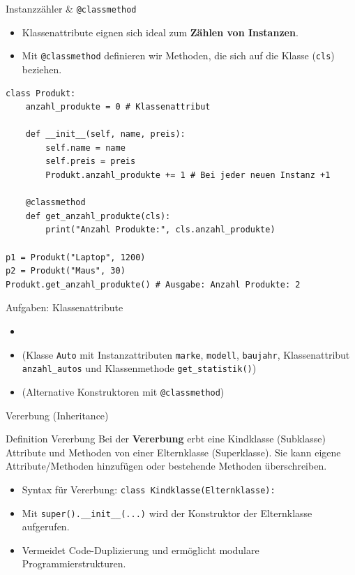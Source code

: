 \begin{frame}[fragile]{Instanzzähler \& \lstinline|@classmethod|}
	\begin{itemize}
		\item Klassenattribute eignen sich ideal zum \textbf{Zählen von Instanzen}.
		\item Mit \lstinline|@classmethod| definieren wir Methoden, die sich auf die Klasse (\lstinline|cls|) beziehen.
	\end{itemize}
	\begin{lstlisting}[basicstyle=\ttfamily\scriptsize]
class Produkt:
    anzahl_produkte = 0 # Klassenattribut

    def __init__(self, name, preis):
        self.name = name
        self.preis = preis
        Produkt.anzahl_produkte += 1 # Bei jeder neuen Instanz +1

    @classmethod
    def get_anzahl_produkte(cls):
        print("Anzahl Produkte:", cls.anzahl_produkte)

p1 = Produkt("Laptop", 1200)
p2 = Produkt("Maus", 30)
Produkt.get_anzahl_produkte() # Ausgabe: Anzahl Produkte: 2
\end{lstlisting}
\end{frame}

\begin{frame}[fragile]{Aufgaben: Klassenattribute}
	\begin{itemize}
		\item {}
		\item {} (Klasse \lstinline|Auto| mit Instanzattributen \lstinline|marke|, \lstinline|modell|, \lstinline|baujahr|, Klassenattribut \lstinline|anzahl_autos| und Klassenmethode \lstinline|get_statistik()|)
		\item {} (Alternative Konstruktoren mit \lstinline|@classmethod|)
	\end{itemize}
\end{frame}

\begin{frame}[fragile]{Vererbung (Inheritance)}
	\begin{block}{Definition Vererbung}
		Bei der \textbf{Vererbung} erbt eine Kindklasse (Subklasse) Attribute und Methoden von einer Elternklasse (Superklasse). Sie kann eigene Attribute/Methoden hinzufügen oder bestehende Methoden überschreiben.
	\end{block}
	\pause
	\begin{itemize}[<+->]
		\item Syntax für Vererbung: \lstinline|class Kindklasse(Elternklasse):|
		\item Mit \lstinline|super().__init__(...)| wird der Konstruktor der Elternklasse aufgerufen.
		\item Vermeidet Code-Duplizierung und ermöglicht modulare Programmierstrukturen.
	\end{itemize}
\end{frame}

